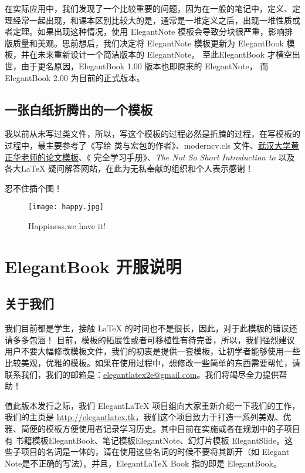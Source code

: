 \documentclass[color=green,mathpazo,titlestyle=hang,11pt]{elegantbook}
\begin{document}
在实际应用中，我们发现了一个比较重要的问题，因为在一般的笔记中，定义、定理经常一起出现，和课本区别比较大的是，通常是一堆定义之后，出现一堆性质或者定理。如果出现这种情况，使用 ElegantNote 模板会导致分块很严重，影响排版质量和美观。思前想后，我们决定将 ElegantNote 模板更新为 ElegantBook 模板，并在未来重新设计一个简洁版本的 ElegantNote。 至此ElegantBook 才横空出世，由于更名原因，ElegantBook 1.00 版本也即原来的 ElegantNote， 而ElegantBook 2.00 为目前的正式版本。

\section{一张白纸折腾出的一个模板}

我以前从未写过类文件，所以，写这个模板的过程必然是折腾的过程，在写模板的过程中，最主要参考了《写给\LaTeXe{} 类与宏包的作者》\cite{packagewriter}、moderncv.cls 文件、\href{http://aff.whu.edu.cn/huangzh/}{武汉大学黄正华老师的论文模板}、《\LaTeXe{} 完全学习手册》\cite{complete}、{\itshape The Not So Short Introduction to \LaTeXe{}}\cite{oetiker2010not}以及各大\LaTeX{} 疑问解答网站，在此为无私奉献的组织和个人表示感谢！

{\color{thid}忍不住插个图！}

\begin{figure}[!hbtp]
\texttt{[image: happy.jpg]}
\caption{Happiness,we have it!\label{figur:happy}}
\end{figure}

\chapter{ElegantBook 开服说明}
\section{关于我们}
 我们目前都是学生，接触 \LaTeX{} 的时间也不是很长，因此，对于此模板的错误还请多多包涵！ 目前，模板的拓展性或者可移植性有待完善，所以，我们强烈建议用户不要大幅修改模板文件，我们的初衷是提供一套模板，让初学者能够使用一些比较美观，优雅的模板。如果在使用过程中，想修改一些简单的东西需要帮忙，请联系我们，我们的邮箱是：\href{elegantlatex2e@gmail.com}{elegantlatex2e@gmail.com}。我们将竭尽全力提供帮助！

值此版本发行之际，我们 Elegant\LaTeX{} 项目组向大家重新介绍一下我们的工作，我们的主页是 \href{http://elegantlatex.tk}{http://elegantlatex.tk}，我们这个项目致力于打造一系列美观、优雅、简便的模板方便使用者记录学习历史。其中目前在实施或者在规划中的子项目有 书籍模板ElegantBook、笔记模板ElegantNote、幻灯片模板 ElegantSlide。这些子项目的名词是一体的，请在使用这些名词的时候不要将其断开（如 Elegant Note是不正确的写法）。并且，Elegant\LaTeX{}  Book 指的即是 ElegantBook。
\end{document}
